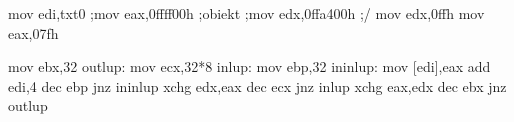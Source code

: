 mov edi,txt0
;mov eax,0ffff00h	;\na obiekt
;mov edx,0ffa400h	;/
mov edx,0ffh
mov eax,07fh

mov ebx,32
outlup:
mov ecx,32*8
inlup:
mov ebp,32
ininlup:
mov [edi],eax
add edi,4
dec ebp
jnz ininlup
xchg edx,eax
dec ecx
jnz inlup
xchg eax,edx
dec ebx
jnz outlup